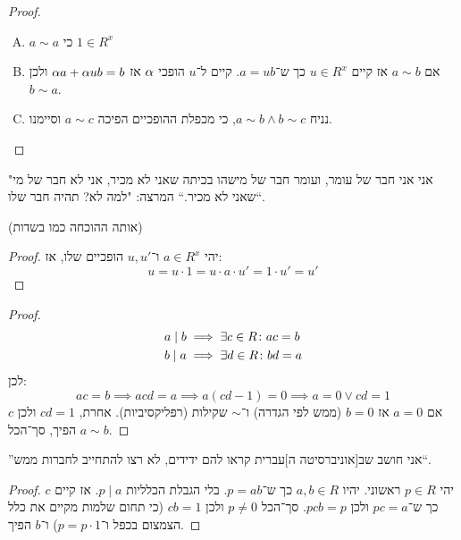 \documentclass[name=רשימות אלגברה לינארית 2א]{../../../tex/classes/megasumPreamble}
\begin{document}
	\begin{proof}\,
		\begin{enumerate}[A.]
			\item $a \sim a$ כי $1 \in R^x$
			\item אם $a \sim b$ אז קיים $u \in R^x$ כך ש־$a = ub$. קיים ל־$u$ הופכי $\alpha$ אז $\alpha a + \alpha u b = b$ ולכן $b \sim a$. 
			\item נניח $a \sim b \land b \sim c$, כי מכפלת ההופכיים הפיכה $a \sim c$ וסיימנו. 
		\end{enumerate}
	\end{proof}
	"אני אני חבר של עומר, ועומר חבר של מישהו בכיתה שאני לא מכיר, אני לא חבר של מי שאני לא מכיר.`` המרצה: "למה לא? תהיה חבר שלו``. 
	
	
	 (אותה ההוכחה כמו בשדות)\begin{proof}
		יהי $a \in R^x$ ו־$u, u'$ הופכיים שלו, אז:
		\[ u = u \cdot 1 = u \cdot a \cdot u' = 1 \cdot u' = u' \]\mathenvendproof
	\end{proof}
	\begin{proof}
		\begin{align*}
			a \mid b &\implies \exists c \in R \colon ac = b \\
			b \mid a &\implies \exists d \in R\colon bd = a
		\end{align*}
		לכן: 
		\[ ac = b \implies acd = a \implies a(cd - 1) = 0 \implies a = 0 \lor cd = 1 \]
		אם $a = 0$ אז $b = 0$ (ממש לפי הגדרה) ו־$\sim$ שקילות (רפליקסיביות). אחרת, $cd = 1$ ולכן $c$ הפיך, סך־הכל $a \sim b$. 
	\end{proof}
	
	''אני חושב שב[אוניברסיטה ה]עברית קראו להם ידידים, לא רצו להתחייב לחברות ממש``. 
	
	
	
	
	
	\begin{proof}
		יהי $p \in R$ ראשוני. יהיו $a, b \in R$ כך ש־$p = ab$. בלי הגבלת הכלליות $p \mid a$. אז קיים $c$ כך ש־$pc = a$ ולכן $pcb = p$. סך־הכל $p \neq 0$ ולכן $cb = 1$ (כי תחום שלמות מקיים את כלל הצמצום בכפל ו־$p = p \cdot 1$) ו־$b$ הפיך. 
	\end{proof}
	
\end{document}
